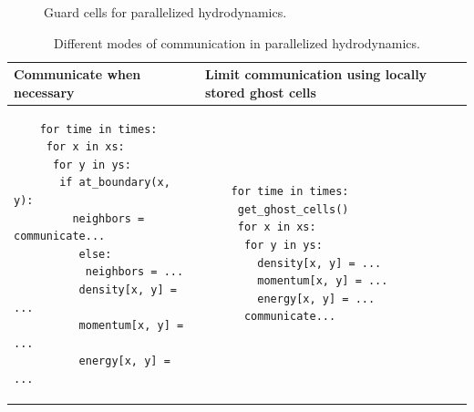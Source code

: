 
\begin{figure}[!htb]
    \centering
    
    \caption{Guard cells for parallelized hydrodynamics.}
    \label{fig:parallel_ncell}
\end{figure}


\begin{table}
    \centering
    \begin{tabular}{|p{}|p{}|}
        \hline
        \textcolor{red1}{Communicate when necessary} & \textcolor{green1}{Limit communication using locally stored ghost cells} \\
        \hline
        \begin{minipage}[t]{0.45\textwidth}
            \begin{verbatim}
    for time in times:
     for x in xs:
      for y in ys:
       if at_boundary(x, y):
         neighbors = communicate...
          else:
           neighbors = ...
          density[x, y] = ...
          momentum[x, y] = ...
          energy[x, y] = ...
            \end{verbatim}
        \end{minipage}
         & \begin{minipage}[t]{0.45\textwidth}
            \begin{verbatim}
    for time in times:
     get_ghost_cells()
     for x in xs:
      for y in ys:
        density[x, y] = ...
        momentum[x, y] = ...
        energy[x, y] = ...
      communicate...
        \end{verbatim}
         \end{minipage} \\
        \hline
    \end{tabular}
    \caption{Different modes of communication in parallelized hydrodynamics.}
    \label{tab:parallel_ncell}
\end{table}

